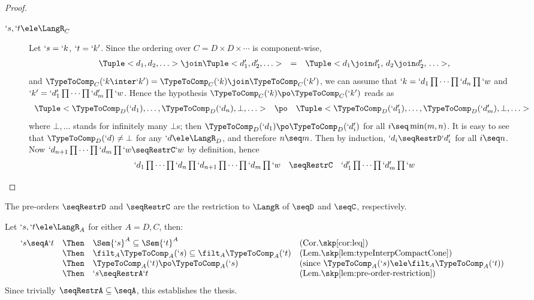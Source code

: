 \documentclass{lmcs}
\begin{document}
\begin{proof}
\begin{description}
 \item [$ `s, `t \ele \LangR_C $] 
Let $ `s = `k$, $`t=`k'$. 
Since the ordering over $C = D \times D \times \cdots$ is component-wise, 
%
 \[ \begin{array}{rcl}
\Tuple <d_1, d_2, \ldots > \join \Tuple <d'_1, d'_2, \ldots > &=& \Tuple <d_1\join d'_1, \, d_2\join d'_2, \, \ldots >,
 \end{array} \] 
and $\TypeToComp_C(`k \inter`k') = \TypeToComp_C(`k) \join \TypeToComp_C(`k')$, we can assume that $`k = `d_1\prod \cdots\prod `d_n\prod `w$ and $`k' = `d'_1\prod \cdots\prod `d'_m\prod `w$. 
Hence the hypothesis $\TypeToComp_C(`k) \po \TypeToComp_C(`k')$ reads as
%
 \[ \begin{array}{rcl@{\quad}lc}
\Tuple <\TypeToComp_D(`d_1), \ldots, \TypeToComp_D(`d_n), \bot, \ldots >
	 &\po& 
\Tuple <\TypeToComp_D(`d'_1), \ldots, \TypeToComp_D(`d'_m), \bot, \ldots > 
 \end{array} \]
where $\bot, \ldots $ stands for infinitely many $\bot$s; then $\TypeToComp_D(`d_1) \po \TypeToComp_D(`d'_i)$ for all $i \seq \min(m,n)$. 
It is easy to see that $\TypeToComp_D(`d) \neq \bot$ for any $`d \ele \LangR_D$, and therefore $n\seq m$.
Then by induction, $`d_i \seqRestrD `d'_i$ for all $i\seq n$. 
Now $`d_{n+1}\prod \cdots\prod `d_m\prod `w\seqRestrC`w$ by definition, hence 
%
 \[ \begin{array}{rcl}
`d_1\prod \cdots\prod `d_n\prod `d_{n+1}\prod \cdots\prod `d_m\prod `w
	&\seqRestrC& 
`d'_1\prod \cdots\prod `d'_m\prod `w
 \end{array} \]	
\arrayqed[-30pt]

 \end{description}

 \end{proof}

 \begin{thm} \label{cor:pre-order-restriction}
The pre-orders $\seqRestrD$ and $\seqRestrC$ are the restriction to $\LangR$ of $\seqD$ and $\seqC$, respectively.
 \end{thm}

 \begin{Proof}
Let $`s,`t \ele \LangR_A$ for either $A=D,C$, then:
%
 \[ \begin{array}{rcl@{\quad}l}
 `s \seqA `t & \Then & \Sem{`s}^A \subseteq \Sem{`t}^A & (\textrm{Cor.\skp\ref{cor:leq}}) \\ %
 & \Then & \filt_A \TypeToComp_A(`s) \subseteq \filt_A \TypeToComp_A(`t) & (\textrm{Lem.\skp\ref{lem:typeInterpCompactCone}}) \\ %
 & \Then & \TypeToComp_A(`t) \po \TypeToComp_A(`s) & (\textrm{since }\TypeToComp_A(`s) \ele \filt_A \TypeToComp_A(`t) ) \\ %
 & \Then & `s \seqRestrA `t & \textrm{(Lem.\skp\ref{lem:pre-order-restriction})} 
 \end{array} \]
Since trivially ${\seqRestrA} \subseteq {\seqA}$, this establishes the thesis. %
 \end{Proof}
\end{document}
